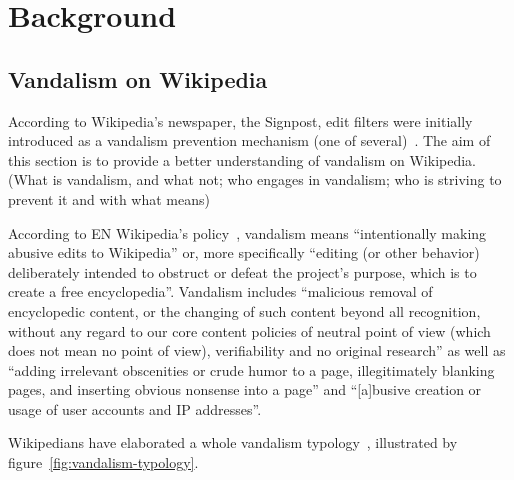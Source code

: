 \chapter{Background}
\label{chap:background}

\section{Vandalism on Wikipedia}

According to Wikipedia's newspaper, the Signpost, edit filters were initially introduced as a vandalism prevention mechanism (one of several)~\cite{Signpost2009}.
The aim of this section is to provide a better understanding of vandalism on Wikipedia. (What is vandalism, and what not; who engages in vandalism; who is striving to prevent it and with what means)


According to EN Wikipedia's policy~\cite{Wikipedia:Vandalism}, vandalism means ``intentionally making abusive edits to Wikipedia'' or, more specifically ``editing (or other behavior) deliberately intended to obstruct or defeat the project's purpose, which is to create a free encyclopedia''.
Vandalism includes ``malicious removal of encyclopedic content, or the changing of such content beyond all recognition, without any regard to our core content policies of neutral point of view (which does not mean no point of view), verifiability and no original research''
as well as ``adding irrelevant obscenities or crude humor to a page, illegitimately blanking pages, and inserting obvious nonsense into a page''
and ``[a]busive creation or usage of user accounts and IP addresses''.

Wikipedians have elaborated a whole vandalism typology~\cite{Wikipedia:Vandalism}, illustrated by figure~\ref{fig:vandalism-typology}.
\begin{comment}
Types of vandalism \url{https://en.wikipedia.org/wiki/Wikipedia:Vandalism#Types_of_vandalism}:
  (Abuse of tags; Account creation, malicious; Avoidant vandalism; Blanking, illegitimate; Copyrighted material, repeated uploading of; Edit summary vandalism; Format vandalism; Gaming the system; Hidden vandalism; Hoaxing vandalism; Image vandalism; Link vandalism; Page creation, illegitimate; Page lengthening; Page-move vandalism; Silly vandalism; Sneaky vandalism; Spam external linking; Stockbroking vandalism; talk page vandalism; Template vandalism; User and user talk page vandalism; Vandalbots;)
\end{comment}

